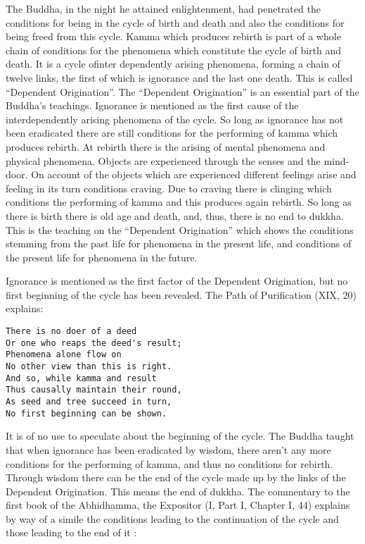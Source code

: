 \documentclass{book}
\begin{document}
The Buddha, in the night he attained enlightenment, had penetrated the
conditions for being in the cycle of birth and death and also the
conditions for being freed from this cycle. Kamma which produces rebirth
is part of a whole chain of conditions for the phenomena which
constitute the cycle of birth and death. It is a cycle ofinter­ dependently arising phenomena, forming a chain of twelve links, the
first of which is ignorance and the last one death. This is called
``Dependent Origination''. The ``Dependent Origination'' is an essential
part of the Buddha's teachings. Ignorance is mentioned as the first
cause of the interdependently arising phenomena of the cycle. So long as
ignorance has not been eradicated there are still conditions for the
performing of kamma which produces rebirth. At rebirth there is the
arising of mental phenomena and physical phenomena. Objects are 
experienced through the senses and the mind-door. On account of the  objects which are experienced different feelings arise and
feeling in its turn conditions craving. Due to craving there is clinging
which conditions the performing of kamma and this produces again
rebirth. So long as there is birth there is old age and death, and, thus,
there is no end to dukkha. This is the teaching on the ``Dependent
Origination'' which shows the conditions stemming from the past life for
phenomena in the present life, and conditions of the present life for
phenomena in the future.

Ignorance is mentioned as the first factor of the Dependent Origination,
but no first beginning of the cycle has been revealed. The Path of
Purification (XIX, 20) explains:

\begin{verbatim}
There is no doer of a deed
Or one who reaps the deed's result;
Phenomena alone flow on
No other view than this is right.
And so, while kamma and result
Thus causally maintain their round,
As seed and tree succeed in turn,
No first beginning can be shown.
\end{verbatim}

It is of no use to speculate about the beginning of the cycle. The
Buddha taught that when ignorance has been eradicated by wisdom, there
aren't any more conditions for the performing of kamma, and thus no
conditions for rebirth. Through wisdom there can be the end of the
cycle made up by the links of the Dependent Origination. This
means the end of dukkha. The commentary to the first book of the Abhi­dhamma, the Expositor (I, Part I, Chapter I, 44) explains by       way of a simile the conditions leading to the contin­uation of the    cycle and those leading to the end of it :
\end{document}
